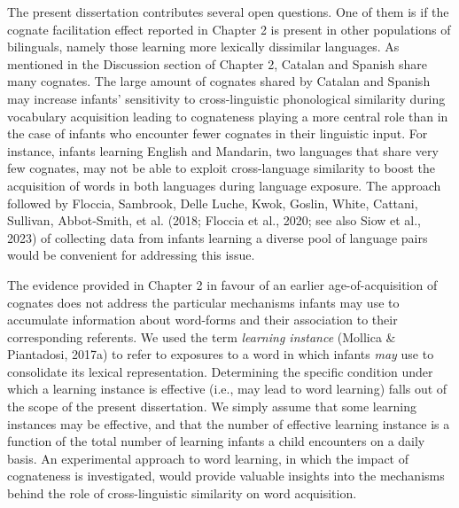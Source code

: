 \documentclass[
  12pt,
  b5paperpaper,
  twoside]{scrreprt}
\begin{document}
The present dissertation contributes several open questions. One of them
is if the cognate facilitation effect reported in Chapter 2 is present
in other populations of bilinguals, namely those learning more lexically
dissimilar languages. As mentioned in the Discussion section of Chapter
2, Catalan and Spanish share many cognates. The large amount of cognates
shared by Catalan and Spanish may increase infants' sensitivity to
cross-linguistic phonological similarity during vocabulary acquisition
leading to cognateness playing a more central role than in the case of
infants who encounter fewer cognates in their linguistic input. For
instance, infants learning English and Mandarin, two languages that
share very few cognates, may not be able to exploit cross-language
similarity to boost the acquisition of words in both languages during
language exposure. The approach followed by Floccia, Sambrook, Delle
Luche, Kwok, Goslin, White, Cattani, Sullivan, Abbot‐Smith, et al.
(2018; Floccia et al., 2020; see also Siow et al., 2023) of collecting
data from infants learning a diverse pool of language pairs would be
convenient for addressing this issue.

The evidence provided in Chapter 2 in favour of an earlier
age-of-acquisition of cognates does not address the particular
mechanisms infants may use to accumulate information about word-forms
and their association to their corresponding referents. We used the term
\emph{learning instance} (Mollica \& Piantadosi, 2017a) to refer to
exposures to a word in which infants \emph{may} use to consolidate its
lexical representation. Determining the specific condition under which a
learning instance is effective (i.e., may lead to word learning) falls
out of the scope of the present dissertation. We simply assume that some
learning instances may be effective, and that the number of effective
learning instance is a function of the total number of learning infants
a child encounters on a daily basis. An experimental approach to word
learning, in which the impact of cognateness is investigated, would
provide valuable insights into the mechanisms behind the role of
cross-linguistic similarity on word acquisition.
\end{document}
